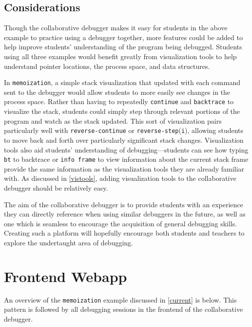 \documentclass[12pt]{article}
\begin{document}
\subsection{Considerations}

Though the collaborative debugger makes it easy for students in the
above example to practice using a debugger together, more features
could be added to help improve students' understanding of the program
being debugged. Students using all three examples would benefit
greatly from visualization tools to help understand pointer locations,
the process space, and data structures.
\par

In \lstinline{memoization}, a simple stack visualization that updated
with each command sent to the debugger would allow students to more
easily see changes in the process space.  Rather than having to
repeatedly \lstinline{continue} and \lstinline{backtrace} to visualize
the stack, students could simply step through relevant portions of the
program and watch as the stack updated.  This sort of visualization
pairs particularly well with \lstinline{reverse-continue} or
\lstinline{reverse-step}(\lstinline{i}), allowing students to move back and forth
over particularly significant stack changes.  Visualization tools also
aid students' understanding of debugging---students can see how typing
\lstinline{bt} to backtrace or \lstinline{info frame} to view
information about the current stack frame provide the same information
as the visualization tools they are already familiar with.  As
discussed in \ref{vistools}, adding visualization tools to the
collaborative debugger should be relatively easy.
\par 

The aim of the collaborative debugger is to provide students with an
experience they can directly reference when using similar debuggers in
the future, as well as one which is seamless to encourage the
acquisition of general debugging skills.  Creating such a platform
will hopefully encourage both students and teachers to explore the
undertaught area of debugging.

\section{Frontend Webapp}\label{webapp}

An overview of the \lstinline{memoization} example discussed in
\ref{current} is below.  This pattern is followed by all debugging
sessions in the frontend of the collaborative debugger.
\end{document}
